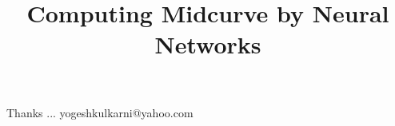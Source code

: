 \documentclass[xcolor=dvipsnames,compress,t,pdf,9pt]{beamer}
\title[\insertframenumber /\inserttotalframenumber]{Computing Midcurve by Neural Networks}
\begin{document}
	\begin{frame}
	\titlepage
%
	\end{frame}
	
%	
	
	
	\begin{frame}[c]{}
	Thanks ...
	\vspace{5mm}
	yogeshkulkarni@yahoo.com
	\end{frame}
\end{document}
